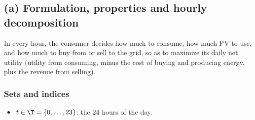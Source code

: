 \subsection{(a) Formulation, properties and hourly decomposition}

In every hour, the consumer decides how much to consume, how much PV to use, and how much
to buy from or sell to the grid, so as to maximize its daily net utility (utility from
consuming, minus the cost of buying and producing energy, plus the revenue from selling).

\subsubsection{Sets and indices}
\begin{itemize}
    \item $t \in \T = \{0, \dots, 23\}$: the 24 hours of the day.
\end{itemize}

